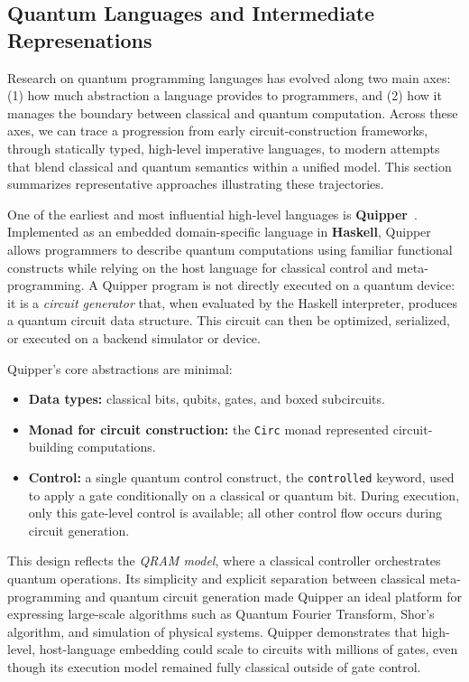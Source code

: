 \subsection{Quantum Languages and Intermediate Represenations}


Research on quantum programming languages has evolved along two main axes: 
(1) how much abstraction a language provides to programmers, and 
(2) how it manages the boundary between classical and quantum computation. 
Across these axes, we can trace a progression from early circuit-construction frameworks, through statically typed, high-level imperative languages, to modern attempts that blend classical and quantum semantics within a unified model. 
This section summarizes representative approaches illustrating these trajectories.

One of the earliest and most influential high-level languages is \textbf{Quipper}~\cite{green2013quipper}. 
Implemented as an embedded domain-specific language in \textbf{Haskell}, Quipper allows programmers to describe quantum computations using familiar functional constructs while relying on the host language for classical control and meta-programming. 
A Quipper program is not directly executed on a quantum device: it is a \emph{circuit generator} that, when evaluated by the Haskell interpreter, produces a quantum circuit data structure. 
This circuit can then be optimized, serialized, or executed on a backend simulator or device.

Quipper’s core abstractions are minimal:
\begin{itemize}
  \item \textbf{Data types:} classical bits, qubits, gates, and boxed subcircuits.
  \item \textbf{Monad for circuit construction:} the \texttt{Circ} monad represented circuit-building computations.
  \item \textbf{Control:} a single quantum control construct, the \texttt{controlled} keyword, used to apply a gate conditionally on a classical or quantum bit. During execution, only this gate-level control is available; all other control flow occurs during circuit generation.
\end{itemize}

This design reflects the \emph{QRAM model}, where a classical controller orchestrates quantum operations. 
Its simplicity and explicit separation between classical meta-programming and quantum circuit generation made Quipper an ideal platform for expressing large-scale algorithms such as Quantum Fourier Transform, Shor’s algorithm, and simulation of physical systems. 
Quipper demonstrates that high-level, host-language embedding could scale to circuits with millions of gates, even though its execution model remained fully classical outside of gate control.

